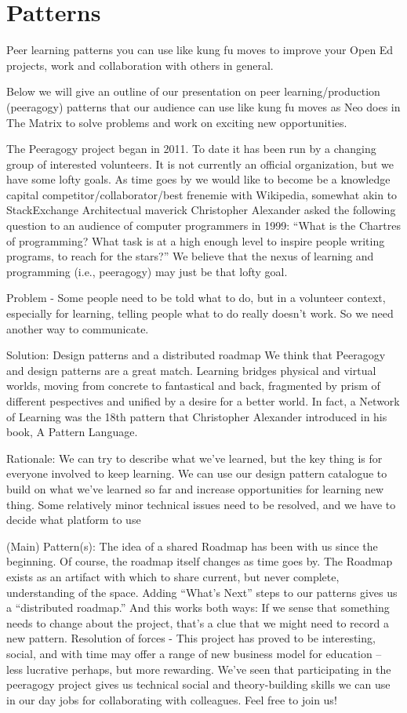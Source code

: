 \section{Patterns}
Peer learning patterns you can use like kung fu moves to improve your Open Ed projects, work and collaboration with others in general.

Below we will give an outline of our presentation on peer learning/production (peeragogy) patterns that our audience can use like kung fu moves as Neo does in The Matrix to solve problems and work on exciting new opportunities.

The Peeragogy project began in 2011.  To date it has been run by a changing group of interested volunteers.   It is not currently an official organization, but we have some lofty goals.  As time goes by we would like to become be a knowledge capital competitor/collaborator/best frenemie with Wikipedia, somewhat akin to StackExchange
Architectual maverick Christopher Alexander asked the following question to an audience of computer programmers in 1999: “What is the Chartres of programming? What task is at a high enough level to inspire people writing programs, to reach for the stars?” 
We believe that the nexus of learning and programming (i.e., peeragogy) may just be that lofty goal.

Problem - Some people need to be told what to do, but in a volunteer context, especially for learning, telling people what to do really doesn't work.  So we need another way to communicate.

Solution: Design patterns and a distributed roadmap
We think that Peeragogy and design patterns are a great match.  Learning bridges physical and virtual worlds, moving from concrete to fantastical and back, fragmented by prism of different pespectives and unified by a desire for a better world. In fact, a Network of Learning was the 18th pattern that Christopher Alexander introduced in his book, A Pattern Language.

Rationale:
We can try to describe what we've learned, but the key thing is for everyone involved to keep learning. We can use our design pattern catalogue to build on what we've learned so far and increase opportunities for learning new thing.
Some relatively minor technical issues need to be resolved, and we
have to decide what platform to use

(Main) Pattern(s):
The idea of a shared Roadmap has been with us since the beginning.  Of course, the roadmap itself changes as time goes by.  The Roadmap  exists as an artifact with which to share current, but never complete,  understanding of the space. Adding “What’s Next” steps to our patterns gives us a “distributed  roadmap.” And this works both ways: If we sense that something needs to  change about the project, that’s a clue that we might need to record a  new pattern.
Resolution of forces -  
This project has proved to be interesting, social, and with time may offer a range of new business model for education -- less lucrative perhaps, but more rewarding.  We've seen that participating in the peeragogy project gives us technical social and theory-building skills we can use in our day jobs for collaborating with colleagues.   Feel free to join us!


